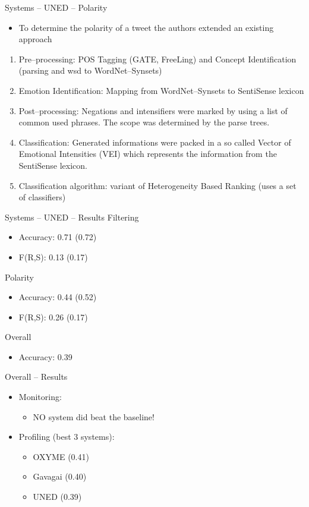 \documentclass[12pt,a4paper]{beamer}
\begin{document}
\begin{frame}{Systems -- UNED -- Polarity}
\begin{itemize}
\item To determine the polarity of a tweet the authors extended an existing approach
\end{itemize}
\begin{enumerate}
\item Pre--processing: POS Tagging (GATE, FreeLing) and Concept Identification (parsing and wsd to WordNet--Synsets)
\item Emotion Identification: Mapping from WordNet--Synsets to SentiSense lexicon
\item Post--processing: Negations and intensifiers were marked by using a list of common used phrases. The scope was determined by the parse trees.
\item Classification: Generated informations were packed in a so called Vector of Emotional Intensities (VEI) which represents the information from the SentiSense lexicon.
\item Classification algorithm: variant of Heterogeneity Based Ranking (uses a set of classifiers)
\end{enumerate}

\end{frame}

\begin{frame}{Systems -- UNED -- Results}
Filtering
\begin{itemize}
\item Accuracy: 0.71 (0.72)
\item F(R,S): 0.13 (0.17)
\end{itemize}
Polarity
\begin{itemize}
\item Accuracy: 0.44 (0.52)
\item F(R,S): 0.26 (0.17)
\end{itemize}
Overall
\begin{itemize}
\item Accuracy: 0.39
\end{itemize}

\end{frame}




\begin{frame}{Overall -- Results}
\begin{itemize}
\item Monitoring:
\begin{itemize}
\item NO system did beat the baseline!
\end{itemize}
\item Profiling (best 3 systems):
\begin{itemize}
\item OXYME (0.41)
\item Gavagai (0.40)
\item UNED (0.39)
\end{itemize}
\end{itemize}
\end{frame}
\end{document}
